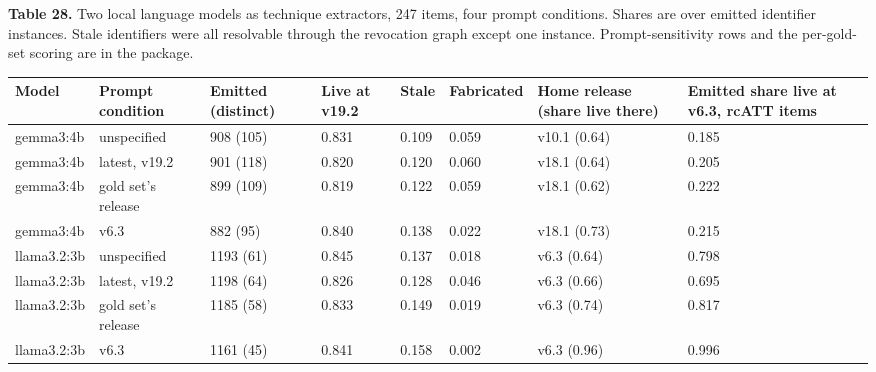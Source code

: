 \documentclass[11pt,a4paper]{article}
\begin{document}
\textbf{Table 28.} Two local language models as technique extractors, 247 items, four prompt conditions. Shares are over emitted identifier instances. Stale identifiers were all resolvable through the revocation graph except one instance. Prompt-sensitivity rows and the per-gold-set scoring are in the package.

\begin{center}\footnotesize
\begin{tabular}{llllllll}
\toprule
Model & Prompt condition & Emitted (distinct) & Live at v19.2 & Stale & Fabricated & Home release (share live there) & Emitted share live at v6.3, rcATT items \\
\midrule
gemma3:4b & unspecified & 908 (105) & 0.831 & 0.109 & 0.059 & v10.1 (0.64) & 0.185 \\
gemma3:4b & latest, v19.2 & 901 (118) & 0.820 & 0.120 & 0.060 & v18.1 (0.64) & 0.205 \\
gemma3:4b & gold set's release & 899 (109) & 0.819 & 0.122 & 0.059 & v18.1 (0.62) & 0.222 \\
gemma3:4b & v6.3 & 882 (95) & 0.840 & 0.138 & 0.022 & v18.1 (0.73) & 0.215 \\
llama3.2:3b & unspecified & 1193 (61) & 0.845 & 0.137 & 0.018 & v6.3 (0.64) & 0.798 \\
llama3.2:3b & latest, v19.2 & 1198 (64) & 0.826 & 0.128 & 0.046 & v6.3 (0.66) & 0.695 \\
llama3.2:3b & gold set's release & 1185 (58) & 0.833 & 0.149 & 0.019 & v6.3 (0.74) & 0.817 \\
llama3.2:3b & v6.3 & 1161 (45) & 0.841 & 0.158 & 0.002 & v6.3 (0.96) & 0.996 \\
\bottomrule
\end{tabular}
\end{center}
\end{document}
